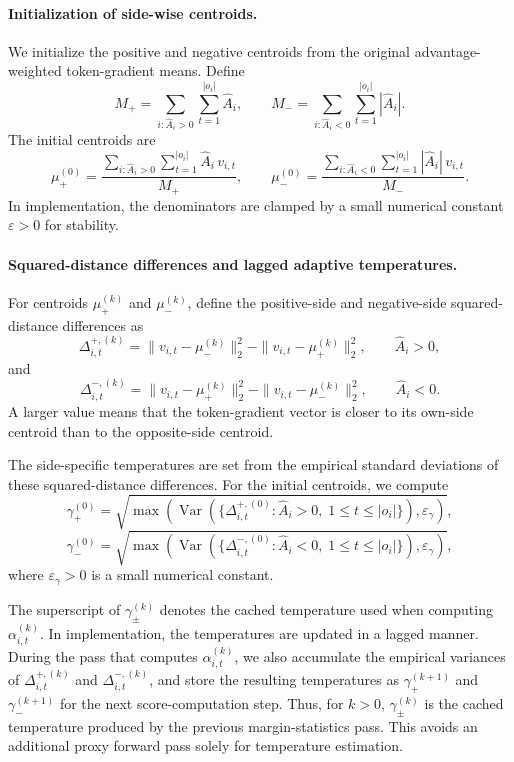 \documentclass{article} %
\begin{document}
\paragraph{Initialization of side-wise centroids.}
We initialize the positive and negative centroids from the original advantage-weighted token-gradient means.
Define
\[
M_+
=
\sum_{i:\hat A_i>0}\sum_{t=1}^{|o_i|}
\hat A_i,
\qquad
M_-
=
\sum_{i:\hat A_i<0}\sum_{t=1}^{|o_i|}
|\hat A_i|.
\]
The initial centroids are
\[
\mu_+^{(0)}
=
\frac{
\sum_{i:\hat A_i>0}\sum_{t=1}^{|o_i|}
\hat A_i\,v_{i,t}
}{
M_+
},
\qquad
\mu_-^{(0)}
=
\frac{
\sum_{i:\hat A_i<0}\sum_{t=1}^{|o_i|}
|\hat A_i|\,v_{i,t}
}{
M_-
}.
\]
In implementation, the denominators are clamped by a small numerical constant \(\varepsilon>0\) for stability.

\paragraph{Squared-distance differences and lagged adaptive temperatures.}
For centroids \(\mu_+^{(k)}\) and \(\mu_-^{(k)}\), define the positive-side and negative-side squared-distance differences as
\[
\Delta_{i,t}^{+,(k)}
=
\|v_{i,t}-\mu_-^{(k)}\|_2^2
-
\|v_{i,t}-\mu_+^{(k)}\|_2^2,
\qquad \hat A_i>0,
\]
and
\[
\Delta_{i,t}^{-,(k)}
=
\|v_{i,t}-\mu_+^{(k)}\|_2^2
-
\|v_{i,t}-\mu_-^{(k)}\|_2^2,
\qquad \hat A_i<0.
\]
A larger value means that the token-gradient vector is closer to its own-side centroid than to the opposite-side centroid.

The side-specific temperatures are set from the empirical standard deviations of these squared-distance differences.
For the initial centroids, we compute
\[
\gamma_+^{(0)}
=
\sqrt{
\max\!\left(
\operatorname{Var}\!\left(
\{\Delta_{i,t}^{+,(0)}:\hat A_i>0,\;1\le t\le |o_i|\}
\right),
\varepsilon_\gamma
\right)
},
\]
\[
\gamma_-^{(0)}
=
\sqrt{
\max\!\left(
\operatorname{Var}\!\left(
\{\Delta_{i,t}^{-,(0)}:\hat A_i<0,\;1\le t\le |o_i|\}
\right),
\varepsilon_\gamma
\right)
},
\]
where \(\varepsilon_\gamma>0\) is a small numerical constant.

The superscript of \(\gamma_\pm^{(k)}\) denotes the cached temperature used when computing \(\alpha_{i,t}^{(k)}\).
In implementation, the temperatures are updated in a lagged manner.
During the pass that computes \(\alpha_{i,t}^{(k)}\), we also accumulate the empirical variances of \(\Delta_{i,t}^{+,(k)}\) and \(\Delta_{i,t}^{-,(k)}\), and store the resulting temperatures as \(\gamma_+^{(k+1)}\) and \(\gamma_-^{(k+1)}\) for the next score-computation step.
Thus, for \(k>0\), \(\gamma_\pm^{(k)}\) is the cached temperature produced by the previous margin-statistics pass.
This avoids an additional proxy forward pass solely for temperature estimation.
\end{document}
